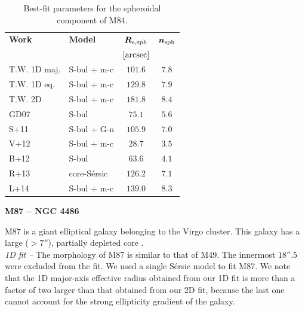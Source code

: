 \documentclass[preprint2]{emulateapj}
\begin{document}
  \begin{table}[h]
  \small
  \caption{Best-fit parameters for the spheroidal component of M84.}
  \begin{center}
  \begin{tabular}{llcc}
  \hline
  {\bf Work} & {\bf Model}   & $\bm R_{\rm e,sph}$    & $\bm n_{\rm sph}$ \\
    &  &  $[\rm arcsec]$ & \\
  \hline
  T.W. 1D maj. & S-bul + m-c   & $101.6$  &  $7.8$ \\
  T.W. 1D eq.  & S-bul + m-c   & $129.8$  &  $7.9$ \\
  T.W. 2D      & S-bul + m-c   & $181.8$  &  $8.4$ \\
  \hline
  GD07         & S-bul         & $75.1$   &  $5.6$ \\
  S+11         & S-bul + G-n   & $105.9$  &  $7.0$ \\
  V+12         & S-bul + m-c   & $28.7$   &  $3.5$ \\
  B+12         & S-bul         & $63.6$   &  $4.1$ \\
  R+13         & core-S\'ersic & $126.2$  &  $7.1$ \\
  L+14         & S-bul + m-c   & $139.0$  &  $8.3$ \\
  \hline
  \end{tabular}
  \end{center}
  \label{tab:m84}
  \end{table}

  \clearpage\newpage\noindent
  {\bf M87 -- NGC 4486 \\}

  M87 is a giant elliptical galaxy belonging to the Virgo cluster.
  This galaxy has a large ($> 7''$), partially depleted core \citep{ferrarese2006acsvcs}.\\

  \emph{1D fit -- }
  The morphology of M87 is similar to that of M49.
  The innermost $18''.5$ were excluded from the fit.
  We used a single S\'ersic model to fit M87. 
  We note that the 1D major-axis effective radius obtained from our 1D fit is more than a factor of two larger than that obtained from our 2D fit, 
  because the last one cannot account for the strong ellipticity gradient of the galaxy.  \\
  
\end{document}
